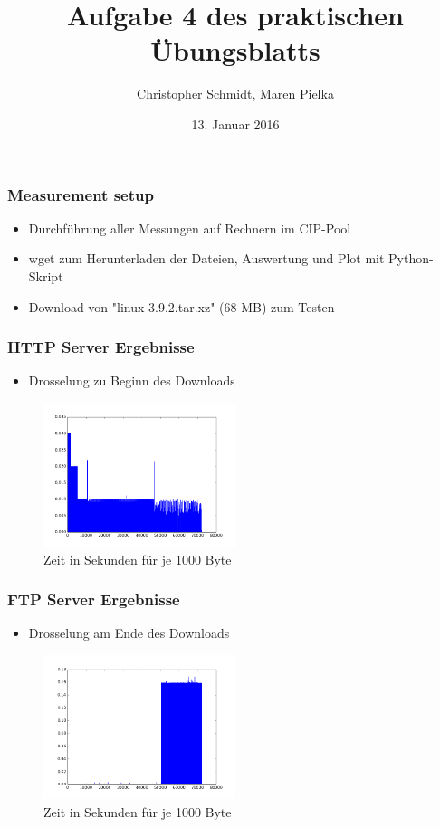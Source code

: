 \documentclass[handout]{beamer}
\title[Aufgabe 4]{Aufgabe 4 des praktischen Übungsblatts}
\author[Schmidt, Pielka]{Christopher Schmidt, Maren Pielka}
\institute[Uni Bonn]{Universität Bonn}
\date[13.01.15]{13. Januar 2016}
\begin{document}
\begin{frame}
\titlepage
\end{frame}

\begin{frame}
\frametitle{Measurement setup}
\begin{itemize}
\item Durchführung aller Messungen auf Rechnern im CIP-Pool
\item wget zum Herunterladen der Dateien, Auswertung und Plot mit Python-Skript
\item Download von "linux-3.9.2.tar.xz" (68 MB) zum Testen 
\end{itemize}
\end{frame}

\begin{frame}
\frametitle{HTTP Server Ergebnisse}
\begin{itemize}
\item Drosselung zu Beginn des Downloads
\end{itemize}
\begin{figure}
\centering
\includegraphics[width=0.5\textwidth]{seconds_http.png}
\caption{Zeit in Sekunden für je 1000 Byte}
\end{figure}
\end{frame}

\begin{frame}
\frametitle{FTP Server Ergebnisse}
\begin{itemize}
\item Drosselung am Ende des Downloads
\end{itemize}
\begin{figure}
\centering
\includegraphics[width=0.5\textwidth]{seconds_ftp.png}
\caption{Zeit in Sekunden für je 1000 Byte}
\end{figure}
\end{frame}
\end{document}
